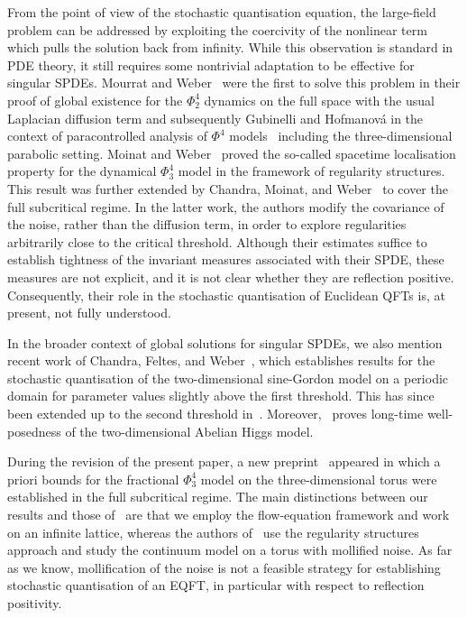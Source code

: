 \documentclass{article}
\numberwithin{equation}{section}
\theoremstyle{plain}
\theoremstyle{definition}
\begin{document}
From the point of view of the stochastic quantisation equation, the
large-field problem can be addressed by exploiting the coercivity of the
nonlinear term which pulls the solution back from infinity. While this
observation is standard in PDE theory, it still requires some nontrivial
adaptation to be effective for singular SPDEs. Mourrat and Weber~{\cite{mourrat2017global}} were the first to solve this problem in their proof of
global existence for the $\Phi^4_2$ dynamics on the full space with the usual
Laplacian diffusion term and subsequently Gubinelli and Hofmanov{\'a} in the
context of paracontrolled analysis of $\Phi^4$
models~{\cite{gubinelliGlobalSolutionsElliptic2019,GH21}} including the
three-dimensional parabolic setting. Moinat and Weber~{\cite{MoinatWeber2020}}
proved the so-called spacetime localisation property for the dynamical
$\Phi^4_3$ model in the framework of regularity structures. This result was
further extended by Chandra, Moinat, and
Weber~{\cite{chandraPrioriBoundsPhi2023}} to cover the full subcritical
regime. In the latter work, the authors modify the covariance of the noise,
rather than the diffusion term, in order to explore regularities arbitrarily
close to the critical threshold. Although their estimates suffice to establish
tightness of the invariant measures associated with their SPDE, these measures
are not explicit, and it is not clear whether they are reflection positive.
Consequently, their role in the stochastic quantisation of Euclidean QFTs is,
at present, not fully understood.

In the broader context of global solutions for singular SPDEs, we also
mention recent work of Chandra, Feltes, and
Weber~{\cite{chandraPrioriBounds2d2024}}, which establishes results for the
stochastic quantisation of the two-dimensional sine-Gordon model on a periodic
domain for parameter values slightly above the first threshold. This has since
been extended up to the second threshold
in~{\cite{bringmannGlobalWellposednessDynamical2025}}.
Moreover,~{\cite{bringmannGlobalWellposednessStochastic2024}} proves long-time
well-posedness of the two-dimensional Abelian Higgs model.

During the revision of the present paper, a new
preprint~{\cite{esquivelPrioriBoundsDynamic2024}} appeared in which a priori
bounds for the fractional $\Phi_3^4$ model on the three-dimensional torus were
established in the full subcritical regime. The main distinctions between our
results and those of~{\cite{esquivelPrioriBoundsDynamic2024}} are that we
employ the flow-equation framework and work on an infinite lattice,
whereas the authors of~{\cite{esquivelPrioriBoundsDynamic2024}} use the regularity structures
approach and study the continuum model on a torus with mollified noise. As far
as we know, mollification of the noise is not a feasible strategy for
establishing stochastic quantisation of an EQFT, in particular with respect to
reflection positivity.
\end{document}
